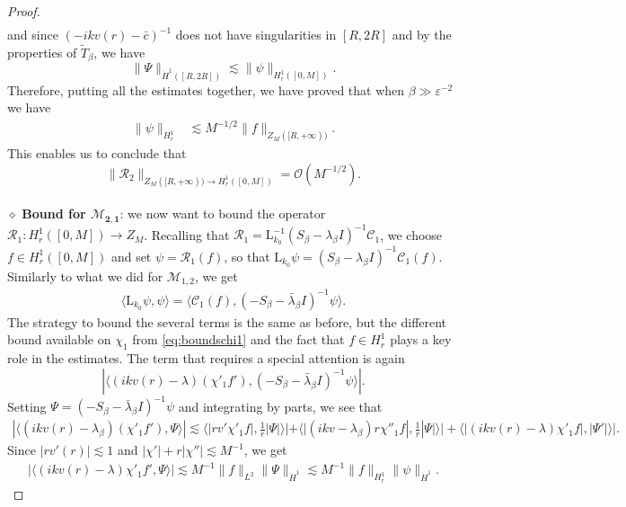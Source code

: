 \documentclass[10pt,a4paper]{amsart}
\def\HH {\dot{H}^1}
\def\eps{\varepsilon}
\newcommand{\cM}{\mathcal{M}}
\newcommand{\cO}{\mathcal{O}}
\newcommand{\cR}{\mathcal{R}}
\newcommand{\rmL}{\mathrm{L}}
\begin{document}
\begin{proof}
\begin{align}
\end{align}
and since $(-ikv(r)-\bar c)^{-1}$ does not have singularities in $[R,2R]$ and by the properties of $\tilde T_\beta$, we have
\begin{equation}
\label{eq:psiPsi}
    \| \Psi\|_{\HH([R,2R])} \lesssim \|\psi\|_{H^1_r([0,M])}.
\end{equation}
Therefore, putting all the estimates together, we have proved that when $\beta\gg \eps^{-2}$ we have
\begin{align}
\|\psi\|_{H^1_r} & \lesssim M^{-1/2} \| f\|_{Z_M([R, +\infty))} .
\end{align}
This enables us to conclude that
\begin{equation}
\|\mathcal R_2\|_{Z_M([R, +\infty)) \rightarrow H^1_r([0, M])} = \cO(M^{-1/2}).
\end{equation}
\\
\noindent $\diamond$ \textbf{Bound for $\mathbf{\cM_{2,1}}$}: we now want to bound the operator $\cR_1: H^1_r([0,M]) \to Z_M$. 
Recalling that $\cR_1 = \rmL_{k_0}^{-1}(S_\beta-\lambda_\beta I)^{-1}\mathcal{C}_1$, we choose $f \in H^1_r([0,M]) $ and set $\psi = \cR_1(f)$, so that 
$\rmL_{k_0} \psi = (S_\beta-\lambda_\beta I)^{-1}\mathcal{C}_1(f)$. Similarly to what we did for $\cM_{1,2}$, we get
\begin{align}
\label{eq:M21}
    \langle \rmL_{k_0} \psi, \psi \rangle = \langle \mathcal{C}_1(f) , (-S_\beta-\bar \lambda_\beta I)^{-1} \psi \rangle.
\end{align}
The strategy to bound the several terms is the same as before, but the different bound available on $\chi_1$ from \cref{eq:boundschi1} and the fact that $f\in H^1_r$ plays a key role in the estimates.
The term that requires a special attention is again 
\begin{equation}
    |\langle (ikv(r) - \lambda) (\chi'_1 f'), (-S_\beta-\bar \lambda_\beta I)^{-1}  \psi\rangle|.
\end{equation}
Setting $\Psi = (-S_\beta-\bar \lambda_\beta I)^{-1}  \psi$ and integrating by parts, we see that
\begin{align}
    |\langle (ikv(r) - \lambda_\beta) (\chi'_1 f'), \Psi\rangle|\lesssim \langle |rv' \chi'_1 f|, \frac{1}{r}|\Psi| \rangle|+\langle |(ikv-\lambda_\beta) r\chi''_1 f|, \frac{1}{r}|\Psi| \rangle|+\langle |(ikv(r)-\lambda)\chi'_1 f|, |\Psi '| \rangle|.
\end{align}
Since $|rv'(r)|\lesssim 1$ and $|\chi'|+r|\chi''|\lesssim M^{-1}$, we get
\begin{align}
|\langle (ikv(r) - \lambda)\chi'_1 f', \Psi \rangle | \lesssim   M^{-1} \|f\|_{L^2} \| \Psi\|_{\dot{H}^1}\lesssim M^{-1} \|f\|_{H^1_r} \|\psi\|_{\dot{H}^1}.

\end{align}
\end{proof}
\end{document}
